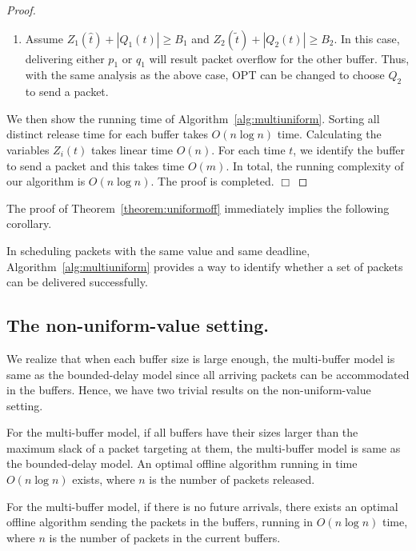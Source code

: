 \documentclass[final, 11pt]{article}
\begin{document}
\begin{proof}
\begin{enumerate}
\item Assume $Z_1({\hat t}) + |Q_1(t)| \ge B_1$ and $Z_2({\tilde t}) + |Q_2(t)| \ge B_2$. In this case, delivering either $p_1$ or $q_1$ will result packet overflow for the other buffer. Thus, with the same analysis as the above case, OPT can be changed to choose $Q_2$ to send a packet.
\end{enumerate}

We then show the running time of Algorithm~\ref{alg:multiuniform}. Sorting all distinct release time for each buffer takes $O(n \log n)$ time. Calculating the variables $Z_i(t)$ takes linear time $O(n)$. For each time $t$, we identify the buffer to send a packet and this takes time $O(m)$. In total, the running complexity of our algorithm is $O(n \log n)$. The proof is completed. $\Box$
\end{proof}

The proof of Theorem~\ref{theorem:uniformoff} immediately implies the following corollary.

\begin{corollary}
In scheduling packets with the same value and same deadline, Algorithm~\ref{alg:multiuniform} provides a way to identify whether a set of packets can be delivered successfully.
\end{corollary}


\subsection{The non-uniform-value setting.}

We realize that when each buffer size is large enough, the multi-buffer model is same as the bounded-delay model since all arriving packets can be accommodated in the buffers. Hence, we have two trivial results on the non-uniform-value setting.

\begin{lemma}
For the multi-buffer model, if all buffers have their sizes larger than the maximum slack of a packet targeting at them, the multi-buffer model is same as the bounded-delay model. An optimal offline algorithm running in time $O(n \log n)$ exists, where $n$ is the number of packets released.
\end{lemma}

\begin{corollary}
For the multi-buffer model, if there is no future arrivals, there exists an optimal offline algorithm sending the packets in the buffers, running in $O(n \log n)$ time, where $n$ is the number of packets in the current buffers.
\label{coro:multi}
\end{corollary}
\end{document}
